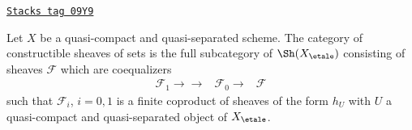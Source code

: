 \begin{lemma}
\label{etale-cohomology-lemma-category-constructible-sets}
\href{https://stacks.math.columbia.edu/tag/09Y9}{\texttt{Stacks tag 09Y9}}

Let $X$ be a quasi-compact and quasi-separated scheme. The category of
constructible sheaves of sets is the full subcategory of $\Sh(X_\etale)$
consisting of sheaves $\mathcal{F}$ which are coequalizers
$$
\begin{array}{ccc}\mathcal{F}_1
\longrightarrow\longrightarrow & \mathcal{F}_0 \longrightarrow & \mathcal{F}\end{array}
$$
such that $\mathcal{F}_i$, $i = 0, 1$ is a finite coproduct of sheaves of
the form $h_U$ with $U$ a quasi-compact and quasi-separated
object of $X_\etale$.
\end{lemma}

